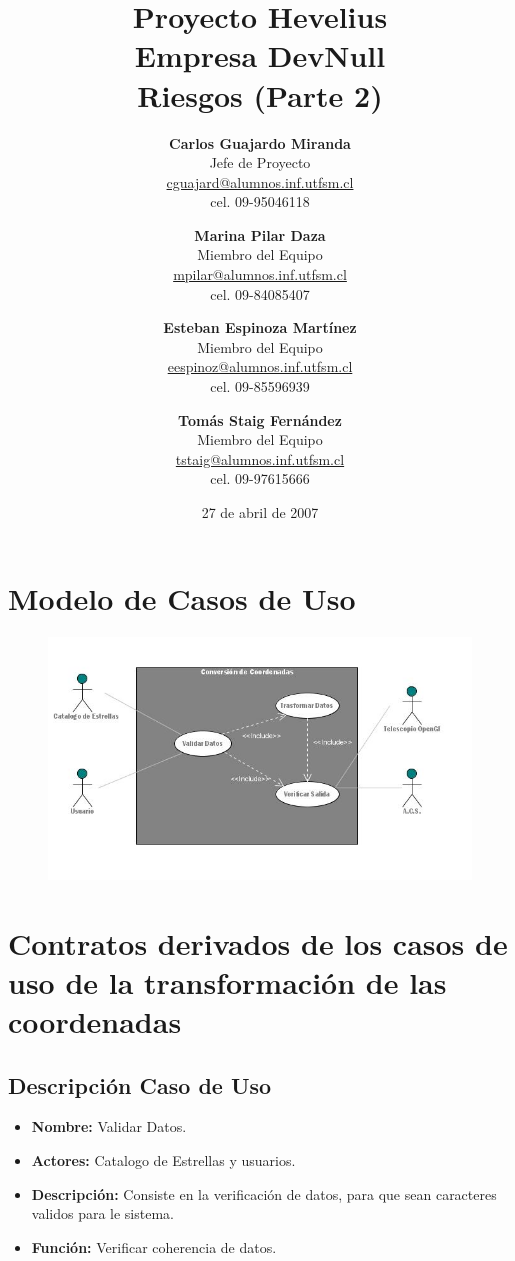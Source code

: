 \documentclass[letterpaper,spanish,10pt]{article}
\title{{\Huge \bf Proyecto Hevelius} \\ {\Large Empresa DevNull} \\ {\small Riesgos (Parte 2)}}
\author{
{\bf Carlos Guajardo Miranda} \\ Jefe de Proyecto \\ \url{cguajard@alumnos.inf.utfsm.cl} \\ cel. 09-95046118 
\and
{\bf Marina Pilar Daza} \\ Miembro del Equipo \\ \url{mpilar@alumnos.inf.utfsm.cl} \\ cel. 09-84085407
\and
{\bf Esteban Espinoza Mart\'inez} \\ Miembro del Equipo \\ \url{eespinoz@alumnos.inf.utfsm.cl} \\ cel. 09-85596939
\and
{\bf Tom\'as Staig Fern\'andez} \\ Miembro del Equipo \\ \url{tstaig@alumnos.inf.utfsm.cl} \\ cel. 09-97615666
}
\date{27 de abril de 2007}
\begin{document}
\maketitle


%
%
\newpage



\section{Modelo de Casos de Uso}

\begin{figure}[h]
  \centering
    \includegraphics[width=7in]{modelo}
\end{figure}



\section{Contratos derivados de los casos de uso de la transformaci\'on de las coordenadas}

\subsection{Descripci\'on Caso de Uso}

\begin{itemize}
\item \textbf{Nombre:} Validar Datos.
\item \textbf{Actores:} Catalogo de Estrellas y usuarios.
\item \textbf{Descripci\'on:} Consiste en la verificaci\'on de datos, para que sean caracteres validos para le sistema.
\item \textbf{Funci\'on:} Verificar coherencia de datos.
\end{itemize}
\end{document}
